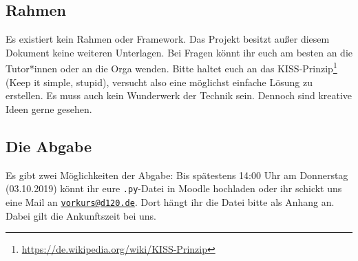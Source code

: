 \subsection*{Rahmen}
Es existiert kein Rahmen oder Framework. Das Projekt besitzt außer diesem Dokument keine weiteren Unterlagen. Bei Fragen könnt ihr euch am besten an die Tutor*innen oder an die Orga wenden. Bitte haltet euch an das KISS-Prinzip\footnote[2]{\url{https://de.wikipedia.org/wiki/KISS-Prinzip}} (Keep it simple, stupid), versucht also eine möglichst einfache Lösung zu erstellen. Es muss auch kein Wunderwerk der Technik sein. Dennoch sind kreative Ideen gerne gesehen.

\subsection*{Die Abgabe}
Es gibt zwei Möglichkeiten der Abgabe: Bis spätestens 14:00 Uhr am Donnerstag (03.10.2019) könnt ihr eure \texttt{.py}-Datei in Moodle hochladen oder ihr schickt uns eine Mail an \href{mailto:vorkurs@d120.de}{\nolinkurl{vorkurs@d120.de}}. Dort hängt ihr die Datei bitte als Anhang an. Dabei gilt die Ankunftszeit bei uns.

